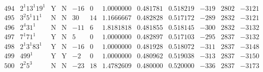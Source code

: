 \documentclass[11pt,reqno,a4letter]{article}
\numberwithin{figure}{section}
\numberwithin{table}{section}
\theoremstyle{plain}
\numberwithin{theorem}{section}
\theoremstyle{definition}
\begin{document}
\begin{table}[ht]
\begin{equation*}
{\begin{array}{cc|cc|ccc|cc|ccc}
 494 & 2^1 13^1 19^1 & \text{Y} & \text{N} & -16 & 0 & 1.0000000 & 0.481781 & 0.518219 & -319 & 2802 & -3121 \\
 495 & 3^2 5^1 11^1 & \text{N} & \text{N} & 30 & 14 & 1.1666667 & 0.482828 & 0.517172 & -289 & 2832 & -3121 \\
 496 & 2^4 31^1 & \text{N} & \text{N} & -11 & 6 & 1.8181818 & 0.481855 & 0.518145 & -300 & 2832 & -3132 \\
 497 & 7^1 71^1 & \text{Y} & \text{N} & 5 & 0 & 1.0000000 & 0.482897 & 0.517103 & -295 & 2837 & -3132 \\
 498 & 2^1 3^1 83^1 & \text{Y} & \text{N} & -16 & 0 & 1.0000000 & 0.481928 & 0.518072 & -311 & 2837 & -3148 \\
 499 & 499^1 & \text{Y} & \text{Y} & -2 & 0 & 1.0000000 & 0.480962 & 0.519038 & -313 & 2837 & -3150 \\
 500 & 2^2 5^3 & \text{N} & \text{N} & -23 & 18 & 1.4782609 & 0.480000 & 0.520000 & -336 & 2837 & -3173 \\  
\end{array}
}
\end{equation*}

\end{table} 

\clearpage 

\end{document}
